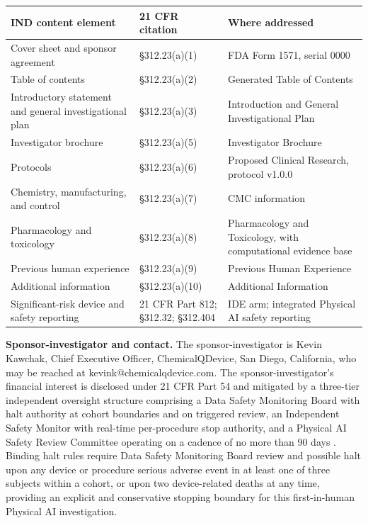 \noindent\begin{tabularx}{\textwidth}{L{4.6cm} L{3.4cm} Y}
\toprule
\textbf{IND content element} & \textbf{21 CFR citation} & \textbf{Where addressed} \\
\midrule
Cover sheet and sponsor agreement & \S 312.23(a)(1) & FDA Form 1571, serial 0000 \\
Table of contents & \S 312.23(a)(2) & Generated Table of Contents \\
Introductory statement and general investigational plan & \S 312.23(a)(3) & Introduction and General Investigational Plan \\
Investigator brochure & \S 312.23(a)(5) & Investigator Brochure \\
Protocols & \S 312.23(a)(6) & Proposed Clinical Research, protocol v1.0.0 \\
Chemistry, manufacturing, and control & \S 312.23(a)(7) & CMC information \\
Pharmacology and toxicology & \S 312.23(a)(8) & Pharmacology and Toxicology, with computational evidence base \\
Previous human experience & \S 312.23(a)(9) & Previous Human Experience \\
Additional information & \S 312.23(a)(10) & Additional Information \\
Significant-risk device and safety reporting & 21 CFR Part 812; \S 312.32; \S 312.404 & IDE arm; integrated Physical AI safety reporting \\
\bottomrule
\end{tabularx}

\noindent\textbf{Sponsor-investigator and contact.} The sponsor-investigator is Kevin Kawchak, Chief Executive Officer, ChemicalQDevice, San Diego, California, who may be reached at kevink@chemicalqdevice.com. The sponsor-investigator's financial interest is disclosed under 21 CFR Part 54 and mitigated by a three-tier independent oversight structure comprising a Data Safety Monitoring Board with halt authority at cohort boundaries and on triggered review, an Independent Safety Monitor with real-time per-procedure stop authority, and a Physical AI Safety Review Committee operating on a cadence of no more than 90 days \cite{paisitedocpk}. Binding halt rules require Data Safety Monitoring Board review and possible halt upon any device or procedure serious adverse event in at least one of three subjects within a cohort, or upon two device-related deaths at any time, providing an explicit and conservative stopping boundary for this first-in-human Physical AI investigation.

